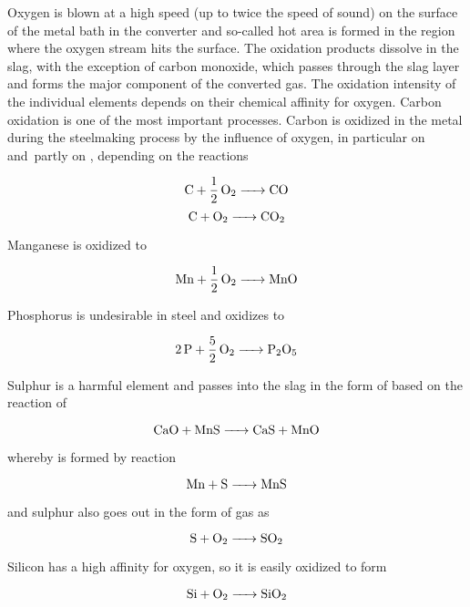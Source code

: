 Oxygen is blown at a high speed (up to twice the speed of sound) on the surface of the metal bath in the converter and so-called hot area is formed in the region where the oxygen stream hits the surface. The oxidation products dissolve in the slag, with the exception of carbon monoxide, which passes through the slag layer and forms the major component of the converted gas. The oxidation intensity of the individual elements depends on their chemical affinity for oxygen. Carbon oxidation is one of the most important processes. Carbon is oxidized in the metal during the steelmaking process by the influence of oxygen, in particular on  and~partly on , depending on the reactions

\begin{equation}
\ce{C + 1/2O2 -> CO}
\end{equation}
\begin{equation}
\ce{C + O2 -> CO2}
\end{equation}

Manganese is oxidized to 

\begin{equation}
\ce{Mn + 1/2O2 -> MnO}
\end{equation}

Phosphorus is undesirable in steel and oxidizes to 

\begin{equation}
\ce{2P + 5/2O2 -> P2O5}
\end{equation}

Sulphur is a harmful element and passes into the slag in the form of  based on the reaction of 

\begin{equation}
\ce{CaO + MnS -> CaS + MnO}
\end{equation}

whereby  is formed by reaction

\begin{equation}
\ce{Mn + S -> MnS}
\end{equation}

and sulphur also goes out in the form of gas as 

\begin{equation}
\ce{S + O2 -> SO2}
\end{equation}

Silicon has a high affinity for oxygen, so it is easily oxidized to form 

\begin{equation}
\ce{Si + O2 -> SiO2}
\end{equation}

